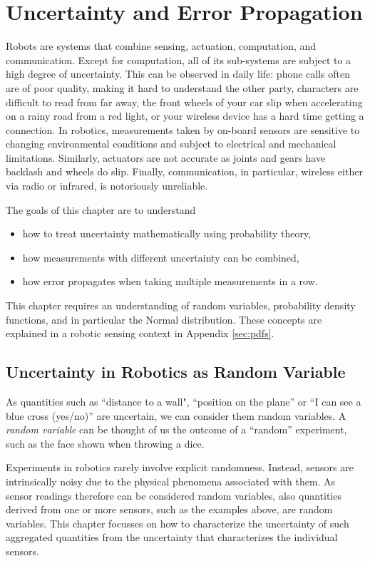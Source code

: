 \chapter{Uncertainty and Error Propagation}\label{chap:uncertainty}
Robots are systems that combine sensing, actuation, computation, and communication. Except for computation, all of its sub-systems are subject to a high degree of uncertainty. This can be observed in daily life: phone calls often are of poor quality, making it hard to understand the other party, characters are difficult to read from far away,  the front wheels of your car slip when accelerating on a rainy road from a red light, or your wireless device has a hard time getting a connection. In robotics, measurements taken by on-board sensors are sensitive to changing environmental conditions and subject to electrical and mechanical limitations. Similarly, actuators are not accurate as joints and gears have backlash and wheels do slip. Finally, communication, in particular, wireless either via radio or infrared, is notoriously unreliable.

The goals of this chapter are to understand
\begin{itemize}
\item how to treat uncertainty mathematically using probability theory,
\item how measurements with different uncertainty can be combined,
\item how error propagates when taking multiple measurements in a row.
\end{itemize}

This chapter requires an understanding of random variables, probability density functions, and in particular the Normal distribution. These concepts are explained in a robotic sensing context in Appendix \ref{sec:pdfs}. 

\section{Uncertainty in Robotics as Random Variable}
As quantities such as ``distance to a wall", ``position on the plane'' or ``I can see a blue cross (yes/no)'' are uncertain, we can consider them random variables. A \emph{random variable} can be thought of us the outcome of a ``random'' experiment, such as the face shown when throwing a dice. 

Experiments in robotics rarely involve explicit randomness. Instead, sensors are intrinsically noisy due to the physical phenomena associated with them. As sensor readings therefore can be considered random variables, also quantities derived from one or more sensors, such as the examples above, are random variables. This chapter focusses on how to characterize the uncertainty of such aggregated quantities from the uncertainty that characterizes the individual sensors. 

